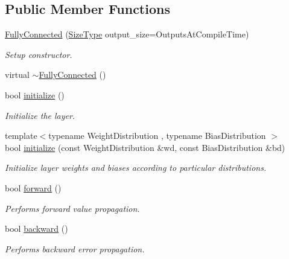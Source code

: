 \subsection*{Public Member Functions}
\begin{DoxyCompactItemize}
\item 
\hyperlink{classffnn_1_1layer_1_1_fully_connected_a3d846cacf7bcbab5dd193b30a16011f2}{Fully\-Connected} (\hyperlink{classffnn_1_1layer_1_1_fully_connected_a2924c85b3cc3e79db3f271cd22cac32c}{Size\-Type} output\-\_\-size=Outputs\-At\-Compile\-Time)
\begin{DoxyCompactList}\small\item\em Setup constructor. \end{DoxyCompactList}\item 
virtual \hyperlink{classffnn_1_1layer_1_1_fully_connected_ad95d27ee5f609c3a9e5c734aed55b935}{$\sim$\-Fully\-Connected} ()
\item 
bool \hyperlink{classffnn_1_1layer_1_1_fully_connected_a55089e2810d6848950da5ca33000da8a}{initialize} ()
\begin{DoxyCompactList}\small\item\em Initialize the layer. \end{DoxyCompactList}\item 
{\footnotesize template$<$typename Weight\-Distribution , typename Bias\-Distribution $>$ }\\bool \hyperlink{classffnn_1_1layer_1_1_fully_connected_a044ad3ef520054c9e94cc80d5096ce47}{initialize} (const Weight\-Distribution \&wd, const Bias\-Distribution \&bd)
\begin{DoxyCompactList}\small\item\em Initialize layer weights and biases according to particular distributions. \end{DoxyCompactList}\item 
bool \hyperlink{classffnn_1_1layer_1_1_fully_connected_a350e7910bd416f67d30113425ea74f59}{forward} ()
\begin{DoxyCompactList}\small\item\em Performs forward value propagation. \end{DoxyCompactList}\item 
bool \hyperlink{classffnn_1_1layer_1_1_fully_connected_ab4a63eb87bd3f2288258b341fcfd165f}{backward} ()
\begin{DoxyCompactList}\small\item\em Performs backward error propagation. \end{DoxyCompactList}\item 

\end{DoxyCompactItemize}
